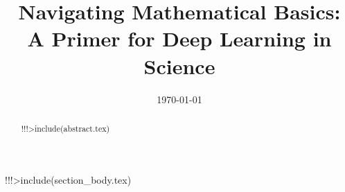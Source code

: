 \documentclass[12pt]{article}
\title{
Navigating Mathematical Basics: \\
A Primer for Deep Learning in Science
}
\date{\today}
\begin{document}
\maketitle
\begin{abstract}
!!!>include(abstract.tex)
\end{abstract}
!!!>include(section_body.tex)


\end{document}
